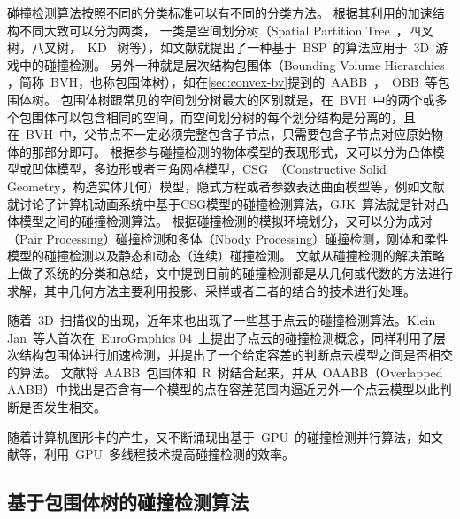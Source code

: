碰撞检测算法按照不同的分类标准可以有不同的分类方法。
根据其利用的加速结构不同大致可以分为两类，
一类是空间划分树（Spatial Partition Tree~，四叉树，八叉树，~KD~
树等），如文献就提出了一种基于~BSP~的算法应用于~3D~游戏中的碰撞检测。
另外一种就是层次结构包围体（Bounding Volume Hierarchies
，简称~BVH，也称包围体树），如在\ref{sec:convex-bv}提到的~AABB~，~OBB~等包围体树。
包围体树跟常见的空间划分树最大的区别就是，在~BVH~中的两个或多个包围体可以包含相同的空间，而空间划分树的每个划分结构是分离的，且在~BVH~中，父节点不一定必须完整包含子节点，只需要包含子节点对应原始物体的那部分即可\cite{ericson2005real}。 
根据参与碰撞检测的物体模型的表现形式，又可以分为凸体模型或凹体模型，多边形或者三角网格模型，CSG~（Constructive
Solid Geometry，构造实体几何）模型，隐式方程或者参数表达曲面模型等，例如文献就讨论了计算机动画系统中基于CSG模型的碰撞检测算法，GJK~算法\cite{Science1999}就是针对凸体模型之间的碰撞检测算法。
根据碰撞检测的模拟环境划分，又可以分为成对（Pair
Processing）碰撞检测和多体（Nbody
Processing）碰撞检测，刚体和柔性模型的碰撞检测以及静态和动态（连续）碰撞检测\cite{lin1998collision}。
文献从碰撞检测的解决策略上做了系统的分类和总结，文中提到目前的碰撞检测都是从几何或代数的方法进行求解，其中几何方法主要利用投影、采样或者二者的结合的技术进行处理。

随着~3D~扫描仪的出现，近年来也出现了一些基于点云的碰撞检测算法。Klein Jan~等人\cite{klein2004point}首次在~EuroGraphics 04~上提出了点云的碰撞检测概念，同样利用了层次结构包围体进行加速检测，并提出了一个给定容差的判断点云模型之间是否相交的算法。
文献\cite{figueiredo2010efficient}将~AABB~包围体和~R~树结合起来，并从~OAABB（Overlapped AABB）中找出是否含有一个模型的点在容差范围内逼近另外一个点云模型以此判断是否发生相交。

随着计算机图形卡的产生，又不断涌现出基于~GPU~的碰撞检测并行算法，如文献等，利用~GPU~多线程技术提高碰撞检测的效率。

\subsection{基于包围体树的碰撞检测算法}
\label{sec:cd-bvh}

